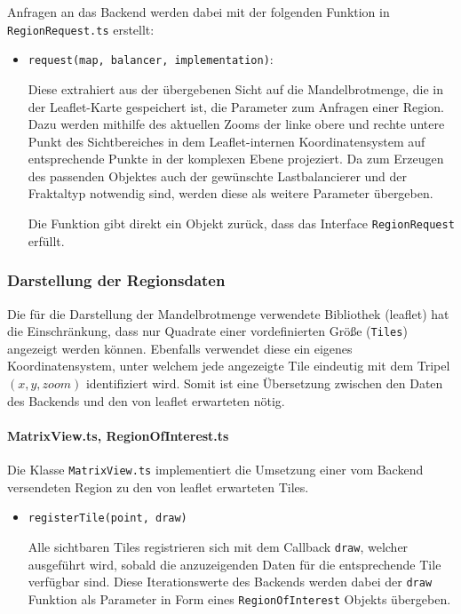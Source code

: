 Anfragen an das Backend werden dabei mit der folgenden Funktion in \verb|RegionRequest.ts| erstellt:
\begin{itemize}
	\item \verb|request(map, balancer, implementation)|:

	      Diese extrahiert aus der übergebenen Sicht auf die Mandelbrotmenge, die in der Leaflet-Karte gespeichert ist,
	      die Parameter zum Anfragen einer Region.
	      Dazu werden mithilfe des aktuellen Zooms der linke obere und rechte untere Punkt des Sichtbereiches
	      in dem Leaflet-internen Koordinatensystem auf entsprechende Punkte in der komplexen Ebene projeziert.
	      Da zum Erzeugen des passenden Objektes auch der gewünschte Lastbalancierer und der Fraktaltyp notwendig sind,
	      werden diese als weitere Parameter übergeben.

	      Die Funktion gibt direkt ein Objekt zurück, dass das Interface \verb|RegionRequest| erfüllt.
\end{itemize}

\subsubsection{Darstellung der Regionsdaten} %

Die für die Darstellung der Mandelbrotmenge verwendete Bibliothek (leaflet) hat die Einschränkung, dass
nur Quadrate einer vordefinierten Größe (\verb|Tiles|) angezeigt werden können. Ebenfalls verwendet diese ein
eigenes Koordinatensystem, unter welchem jede angezeigte Tile eindeutig mit dem Tripel \( (x, y, zoom) \)
identifiziert wird. Somit ist eine Übersetzung zwischen den Daten des Backends und den von leaflet erwarteten nötig.

\paragraph{MatrixView.ts, RegionOfInterest.ts}\label{par:matrixView}
Die Klasse \verb|MatrixView.ts| implementiert die Umsetzung einer vom Backend versendeten Region zu
den von leaflet erwarteten Tiles.
\begin{itemize}
	\item \verb|registerTile(point, draw)|

	      Alle sichtbaren Tiles registrieren sich mit dem Callback \verb|draw|,
	      welcher ausgeführt wird, sobald die anzuzeigenden Daten für die
	      entsprechende Tile verfügbar sind. Diese Iterationswerte des Backends werden dabei der \verb|draw| Funktion als Parameter
	      in Form eines \verb|RegionOfInterest| Objekts übergeben.
\end{itemize}


